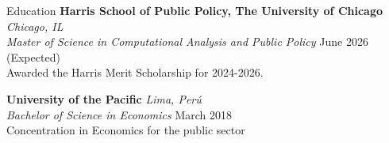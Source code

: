 \documentclass{resume} %
\begin{document}
\begin{rSection}{Education}
    {\bf Harris School of Public Policy, The University of Chicago} \hfill \textit{Chicago, IL} \\
    \textit{Master of Science in Computational Analysis and Public Policy} \hfill {June 2026 (Expected)} \\
    Awarded the Harris Merit Scholarship for 2024-2026.

    {\bf University of the Pacific} \hfill \textit{Lima, Perú} \\
    \textit{Bachelor of Science in Economics} \hfill {March 2018} \\
    Concentration in Economics for the public sector
\end{rSection}
\end{document}
